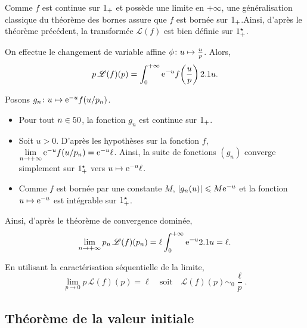 \begin{solution}
\begin{reponses}
\item Comme $f$ est continue sur $\Rp$ et possède une limite en $+\infty$, une généralisation classique du théorème des bornes assure que $f$ est bornée sur $\Rp$.Ainsi, d'après le théorème précédent, la transformée $\mathscr{L}(f)$ est bien définie sur $\Rpe$.

\item On effectue le changement de variable affine $\fonctionligne[\phi]{u}{\frac{u}{p}}$. Alors,
\[
p\, \mathscr{L}(f)(p) = \int_0^{+\infty} \e^{-u} f\mathopen{}\left(\frac{u}{p}\right) \d u.
\]

\item Posons $\fonctionligne[g_n]{u}{\e^{-u} f(u/p_n)}$.
\begin{itemize}
\item Pour tout $n \in \N$, la fonction $g_n$ est continue sur $\Rp$.

\item Soit $u > 0$. D'après les hypothèses sur la fonction $f$, $\lim\limits_{n\to+\infty} \e^{-u} f(u/p_n) = \e^{-u} \ell$. Ainsi, la suite de fonctions $(g_n)$ converge simplement sur $\Rpe$ vers $u \mapsto \e^{-u} \ell$.

\item Comme $f$ est bornée par une constante $M$, $\abs{g_n(u)} \leqslant M \e^{-u}$ et la fonction $u \mapsto \e^{-u}$ est intégrable sur $\Rpe$.
\end{itemize}
Ainsi, d'après le théorème de convergence dominée,
\[
\lim_{n\to+\infty} p_n\, \mathscr{L}(f)(p_n) = \ell \int_0^{+\infty} \e^{-u} \d u = \ell.
\]

\item {}En utilisant la caractérisation séquentielle de la limite,
\[
\lim_{p\to 0} p\, \mathscr{L}(f)(p) = \ell \quad \text{soit} \quad \mathscr{L}(f)(p) \sim_0 \frac{\ell}{p}.
\]
\end{reponses}
\end{solution}

\subsection{Théorème de la valeur initiale}

